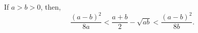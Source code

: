 If $a > b > 0$, then,
\[ \frac{(a - b)^2}{8a} < \frac{a + b}{2} - \sqrt{ab} < \frac{(a - b)^2}{8b}. \]
